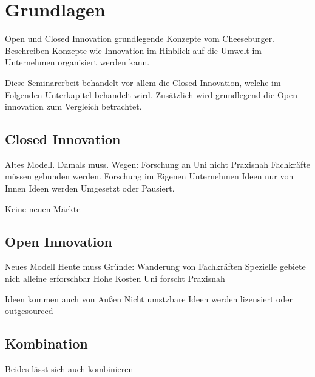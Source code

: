 \section{Grundlagen}\label{sec:grundlagen}

Open und Closed Innovation grundlegende Konzepte vom Cheeseburger.
Beschreiben Konzepte wie Innovation im Hinblick auf die Umwelt im Unternehmen organisiert werden kann.

Diese Seminarerbeit behandelt vor allem die Closed Innovation,
welche im Folgenden Unterkapitel behandelt wird.
Zusätzlich wird grundlegend die Open innovation zum Vergleich betrachtet.

\subsection{Closed Innovation}\label{sec:grundlagen-closed}

Altes Modell.
Damals muss.
Wegen: Forschung an Uni nicht Praxisnah
Fachkräfte müssen gebunden werden.
Forschung im Eigenen Unternehmen
Ideen nur von Innen
Ideen werden Umgesetzt oder Pausiert.

Keine neuen Märkte

\subsection{Open Innovation}\label{sec:grundlagen-open}

Neues Modell
Heute muss
Gründe: Wanderung von Fachkräften
Spezielle gebiete nich alleine erforschbar
Hohe Kosten
Uni forscht Praxisnah

Ideen kommen auch von Außen
Nicht umstzbare Ideen werden lizensiert oder outgesourced



\subsection{Kombination}\label{sec:grundlagen-kombi}

Beides lässt sich auch kombinieren